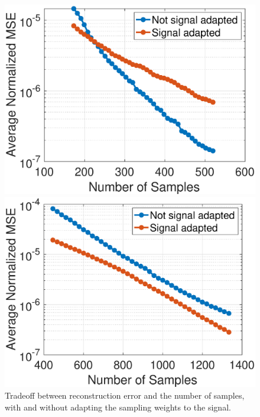 \documentclass[journal, 10pt]{IEEEtran}
\begin{document}
\begin{figure}[H]
\begin{minipage}[m]{0.16\linewidth}
\end{minipage} 
\begin{minipage}[m]{0.4\linewidth}
\centerline{\includegraphics[width=.85\linewidth]{fig_rec_low_nmse}}
\end{minipage}
\begin{minipage}[m]{0.4\linewidth}
\centerline{\includegraphics[width=.85\linewidth]{fig_rec_band_nmse}}
\end{minipage}
\caption{Tradeoff between reconstruction error and the number of samples, with and without adapting the sampling weights to the signal.}\label{Fig:samp_tradeoff}
\end{figure}
\end{document}
